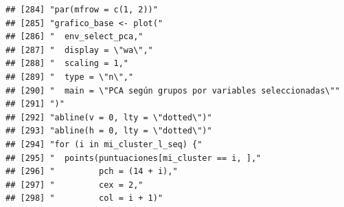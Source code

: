 \documentclass[11pt,]{article}
\begin{document}
\begin{verbatim}
## [284] "par(mfrow = c(1, 2))"                                                                                                                                                  
## [285] "grafico_base <- plot("                                                                                                                                                 
## [286] "  env_select_pca,"                                                                                                                                                     
## [287] "  display = \"wa\","                                                                                                                                                   
## [288] "  scaling = 1,"                                                                                                                                                        
## [289] "  type = \"n\","                                                                                                                                                       
## [290] "  main = \"PCA según grupos por variables seleccionadas\""                                                                                                             
## [291] ")"                                                                                                                                                                     
## [292] "abline(v = 0, lty = \"dotted\")"                                                                                                                                       
## [293] "abline(h = 0, lty = \"dotted\")"                                                                                                                                       
## [294] "for (i in mi_cluster_l_seq) {"                                                                                                                                         
## [295] "  points(puntuaciones[mi_cluster == i, ],"                                                                                                                             
## [296] "         pch = (14 + i),"                                                                                                                                              
## [297] "         cex = 2,"                                                                                                                                                     
## [298] "         col = i + 1)"                                                                                                                                                 

\end{verbatim}
\end{document}
